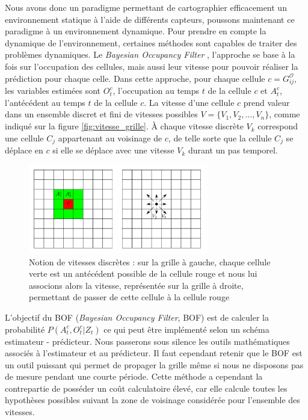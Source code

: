 Nous avons donc un paradigme permettant de cartographier efficacement un environnement statique à l'aide de différents capteurs, poussons maintenant ce paradigme à un environnement dynamique. Pour prendre en compte la dynamique de l'environnement, certaines méthodes sont capables de traiter des problèmes dynamiques. Le \textit{Bayesian Occupancy Filter} \cite{bessiere_bayesian_2008}, l'approche se base à la fois sur l'occupation des cellules, mais aussi leur vitesse pour pouvoir réaliser la prédiction pour chaque celle. Dans cette approche, pour chaque cellule $c = G_{ij}^\mathcal{O}$, les variables estimées sont $O^c_t$, l'occupation au temps $t$ de la cellule $c$ et $A_t^c$, l'antécédent au temps $t$ de la cellule $c$. La vitesse d'une cellule $c$ prend valeur dans un ensemble discret et fini de vitesses possibles $V = \{V_1, V_2, ..., V_n\}$, comme indiqué sur la figure \autoref{fig:vitesse_grille}. À chaque vitesse discrète $V_k$ correspond une cellule $C_j$ appartenant au voisinage de $c$, de telle sorte que la cellule $C_j$ se déplace en $c$ si elle se déplace avec une vitesse $V_k$ durant un pas temporel. 

\begin{figure}[H]
    \centering
    \includegraphics[width = 0.7\textwidth]{Rapport/images/vitesse_discrete.png}
    \caption{Notion de vitesses discrètes : sur la grille à gauche, chaque cellule verte est un antécédent possible de la cellule rouge et nous lui associons alors la vitesse, représentée sur la grille à droite, permettant de passer de cette cellule à la cellule rouge}
    \label{fig:vitesse_grille}
\end{figure}

L'objectif du BOF (\textit{Bayesian Occupancy Filter}, BOF) est de calculer la probabilité $P(A^c_t, O^c_t | Z_t)$ ce qui peut être implémenté selon un schéma estimateur - prédicteur. Nous passerons sous silence les outils mathématiques associés à l'estimateur et au prédicteur. Il faut cependant retenir que le BOF est un outil puissant qui permet de propager la grille même si nous ne disposons pas de mesure pendant une courte période. Cette méthode a cependant la contrepartie de posséder un coût calculatoire élevé, car elle calcule toutes les hypothèses possibles suivant la zone de voisinage considérée pour l'ensemble des vitesses.

